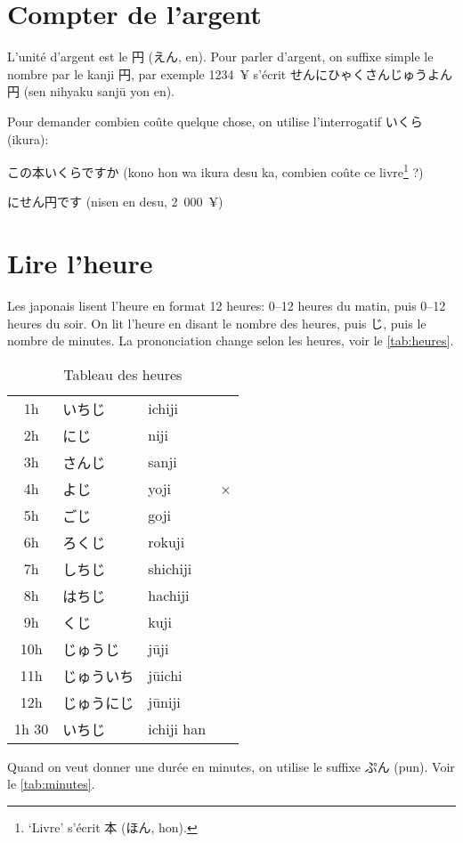 \documentclass[a4paper,10pt,french,openany]{memoir}
\begin{document}
\section{Compter de l'argent}

L'unité d'argent est le 円 (えん, en). Pour parler d'argent, on suffixe simple le nombre par le kanji 円, par exemple 1234~¥ s'écrit せんにひゃくさんじゅうよん円 (sen nihyaku sanjū yon en).

Pour demander combien coûte quelque chose, on utilise l'interrogatif いくら (ikura):
\begin{cquote}{}
 この本いくらですか (kono hon wa ikura desu ka, combien coûte ce livre\footnote{`Livre' s'écrit 本 (ほん, hon).} ?)
  
 にせん円です (nisen en desu, 2~000~¥)
\end{cquote}

\section{Lire l'heure}

Les japonais lisent l'heure en format 12 heures: 0--12 heures du matin, puis 0--12 heures du soir. On lit l'heure en disant le nombre des heures, puis じ, puis le nombre de minutes. La prononciation change selon les heures, voir le \autoref{tab:heures}.

\begin{table}[htbp]
 \centering
 \begin{tabular}{clll}
  1h & いちじ    &ichiji\\
  2h & にじ      &niji\\
  3h & さんじ    &sanji\\
  4h & よじ      &yoji&×\\
  5h & ごじ      &goji\\
  6h & ろくじ    &rokuji\\
  7h & しちじ    &shichiji\\
  8h & はちじ    &hachiji\\
  9h & くじ      &kuji\\
  10h& じゅうじ  &jūji\\
  11h& じゅういち&jūichi\\
  12h& じゅうにじ&jūniji\\
  1h 30& いちじ&ichiji han
 \end{tabular}
 \caption{Tableau des heures}
 \label{tab:heures}
\end{table}

Quand on veut donner une durée en minutes, on utilise le suffixe ぷん (pun). Voir le \autoref{tab:minutes}.
\end{document}

